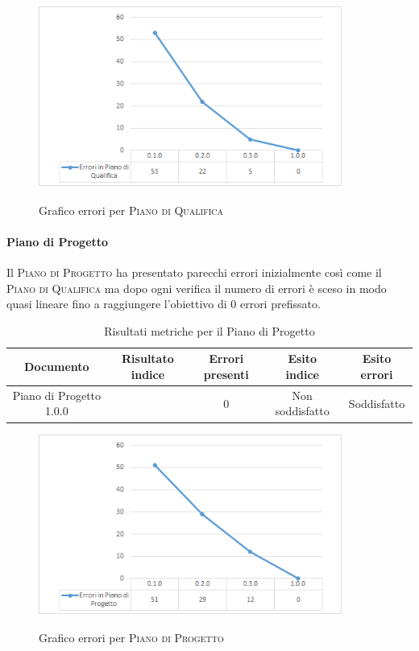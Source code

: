 \documentclass[../piano-di-qualifica.tex]{subfiles}
\begin{document}
\begin{figure}[H]
    \centering
    \includegraphics[width=10cm]{img/erroriPdQ.png}
    \label{fig:scice_documenti}
    \caption{Grafico errori per \textsc{Piano di Qualifica}}
\end{figure}

\paragraph{Piano di Progetto}
\label{sub:piano_di_progetto}
Il \textsc{Piano di Progetto} ha presentato parecchi errori inizialmente così come il \textsc{Piano di Qualifica} ma dopo ogni verifica il numero di errori è sceso in modo quasi lineare fino a raggiungere l'obiettivo di 0 errori prefissato.

\begin{table}[H]
    \centering
    \begin{tabular}{ccccc}
    \hline
    Documento               & Risultato indice & Errori presenti & Esito indice    & Esito errori \\ \hline
    Piano di Progetto 1.0.0 &                  & 0               & Non soddisfatto & Soddisfatto 
    \end{tabular}
    \caption{Risultati metriche per il Piano di Progetto}
    \label{tab:my-table}
\end{table}

\begin{figure}[H]
    \centering
    \includegraphics[width=10cm]{img/erroriPdP.png}
    \label{fig:scice_documenti}
    \caption{Grafico errori per \textsc{Piano di Progetto}}
\end{figure}
\end{document}

